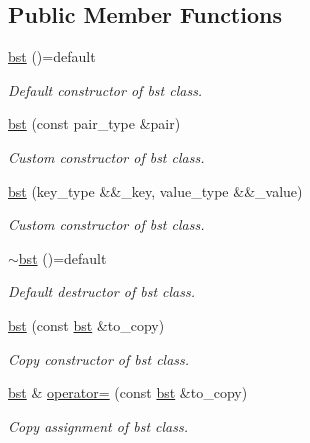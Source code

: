 \subsection*{Public Member Functions}
\begin{DoxyCompactItemize}
\item 
\mbox{\label{classbst_a1f50c9dd4ce8355fcc49e38bd8eac075}} 
\hyperlink{classbst_a1f50c9dd4ce8355fcc49e38bd8eac075}{bst} ()=default
\begin{DoxyCompactList}\small\item\em Default constructor of bst class. \end{DoxyCompactList}\item 
\hyperlink{classbst_a9283be063cf6c8b7c8a8cc84bd0e1313}{bst} (const pair\+\_\+type \&pair)
\begin{DoxyCompactList}\small\item\em Custom constructor of bst class. \end{DoxyCompactList}\item 
\hyperlink{classbst_a2280fc615e6b89c866e4e9c853274956}{bst} (key\+\_\+type \&\&\+\_\+key, value\+\_\+type \&\&\+\_\+value)
\begin{DoxyCompactList}\small\item\em Custom constructor of bst class. \end{DoxyCompactList}\item 
\mbox{\label{classbst_aedb4f6636f4d40488235a1da94975540}} 
\hyperlink{classbst_aedb4f6636f4d40488235a1da94975540}{$\sim$bst} ()=default
\begin{DoxyCompactList}\small\item\em Default destructor of bst class. \end{DoxyCompactList}\item 
\hyperlink{classbst_a4647efd85ea5b63cd3676bf51c8bbfca}{bst} (const \hyperlink{classbst}{bst} \&to\+\_\+copy)
\begin{DoxyCompactList}\small\item\em Copy constructor of bst class. \end{DoxyCompactList}\item 
\hyperlink{classbst}{bst} \& \hyperlink{classbst_ad65d0d6908d7ec4ac231d601774708cf}{operator=} (const \hyperlink{classbst}{bst} \&to\+\_\+copy)
\begin{DoxyCompactList}\small\item\em Copy assignment of bst class. \end{DoxyCompactList}\item 

\end{DoxyCompactItemize}
